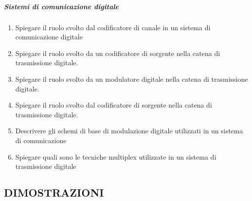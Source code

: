 \documentclass[
]{article}
\providecommand{\tightlist}{%
  \setlength{\itemsep}{0pt}\setlength{\parskip}{0pt}}
\begin{document}
\subparagraph{Sistemi di comunicazione
digitale}\label{sistemi-di-comunicazione-digitale}

\begin{enumerate}
\def\labelenumi{\arabic{enumi}.}
\setcounter{enumi}{42}
\tightlist
\item
  Spiegare il ruolo svolto dal codificatore di canale in un sistema di
  comunicazione digitale
\item
  Spiegare il ruolo svolto da un codificatore di sorgente nella catena
  di trasmissione digitale.
\item
  Spiegare il ruolo svolto da un modulatore digitale nella catena di
  trasmissione digitale.
\item
  Spiegare il ruolo svolto dal codificatore di sorgente nella catena di
  trasmissione digitale.
\item
  Descrivere gli schemi di base di modulazione digitale utilizzati in un
  sistema di comunicazione
\item
  Spiegare quali sono le tecniche multiplex utilizzate in un sistema di
  trasmissione digitale
\end{enumerate}

\subsection{DIMOSTRAZIONI}\label{dimostrazioni}
\end{document}
